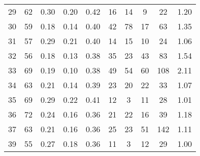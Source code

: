 \begin{tabular}{lccccccccc}
29 &       62 &                             0.30 &                             0.20 &                             0.42 &              16 &              14 &                                  9 &                              22 &       1.20 \\
30 &       59 &                             0.18 &                             0.14 &                             0.40 &              42 &              78 &                                 17 &                              63 &       1.35 \\
31 &       57 &                             0.29 &                             0.21 &                             0.40 &              14 &              15 &                                 10 &                              24 &       1.06 \\
32 &       56 &                             0.18 &                             0.13 &                             0.38 &              35 &              23 &                                 43 &                              83 &       1.54 \\
33 &       69 &                             0.19 &                             0.10 &                             0.38 &              49 &              54 &                                 60 &                             108 &       2.11 \\
34 &       63 &                             0.21 &                             0.14 &                             0.39 &              23 &              20 &                                 22 &                              33 &       1.07 \\
35 &       69 &                             0.29 &                             0.22 &                             0.41 &              12 &               3 &                                 11 &                              28 &       1.01 \\
36 &       72 &                             0.24 &                             0.16 &                             0.36 &              21 &              22 &                                 16 &                              39 &       1.18 \\
37 &       63 &                             0.21 &                             0.16 &                             0.36 &              25 &              23 &                                 51 &                             142 &       1.11 \\
39 &       55 &                             0.27 &                             0.18 &                             0.36 &              11 &               3 &                                 12 &                              29 &       1.00 \\

\end{tabular}
